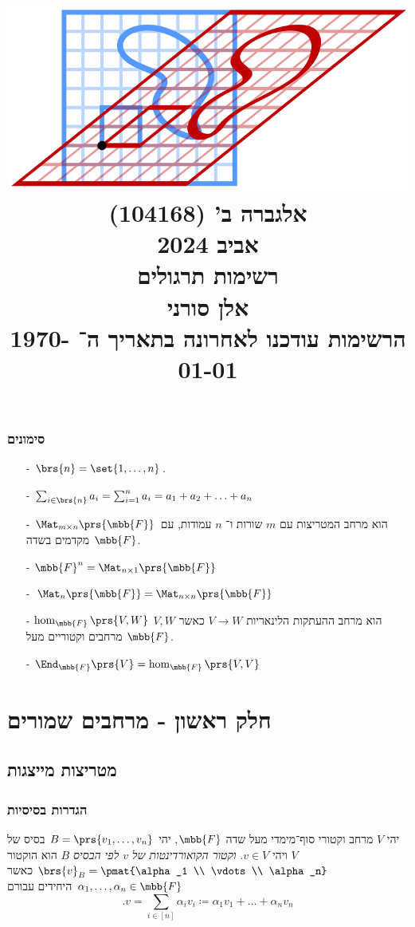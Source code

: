 \documentclass[a4paper,10pt,twoside,openany]{book}
\title{
\includegraphics[width=6in]{images/front.png}\\
\vspace{30pt}
\Huge
אלגברה ב' (104168)
\\
אביב 2024
\\
רשימות תרגולים
\vspace{30pt}
\\
\huge
אלן סורני
\vspace{30pt}
\\
\Large
הרשימות עודכנו לאחרונה בתאריך ה־%
\today
}
\date{}
\begin{document}
\frontmatter
\maketitle
\tableofcontents

\mainmatter

\section*{סימונים}

\begin{itemize}
\item[-]
$\brs{n} = \set{1, \ldots, n}$.
\item[-]
$\sum_{i \in \brs{n}} a_i = \sum_{i=1}^n a_i = a_1 + a_2 + \ldots + a_n$
\item[-] $\Mat_{m \times n}\prs{\mbb{F}}$ הוא מרחב המטריצות עם
$m$
שורות ו־%
$n$
עמודות, עם מקדמים בשדה
$\mbb{F}$.
\item[-]
$\mbb{F}^n = \Mat_{n \times 1}\prs{\mbb{F}}$
\item[-]
$\Mat_{n}\prs{\mbb{F}} = \Mat_{n \times n}\prs{\mbb{F}}$
\item[-]
$\hom_{\mbb{F}}\prs{V,W}$
הוא מרחב ההעתקות הלינאריות
$V \to W$
כאשר
$V,W$
מרחבים וקטוריים מעל
$\mbb{F}$.
\item[-]
$\End_{\mbb{F}}\prs{V} = \hom_{\mbb{F}}\prs{V,V}$
\end{itemize}

\part{חלק ראשון - מרחבים שמורים}

\chapter{מטריצות מייצגות}

\section{הגדרות בסיסיות}

\begin{definition}
יהי
$V$
מרחב וקטורי סוף־מימדי מעל שדה
$\mbb{F}$,
יהי
$B = \prs{v_1, \ldots, v_n}$
בסיס של
$V$
ויהי
$v \in V$.
\emph{וקטור הקואורדינטות של
$v$
לפי הבסיס
$B$}
הוא הוקטור
$\brs{v}_B = \pmat{\alpha_1 \\ \vdots \\ \alpha_n}$
כאשר
$\alpha_1, \ldots, \alpha_n \in \mbb{F}$
היחידים עבורם
\[\text{.}v = \sum_{i \in [n]} \alpha_i v_i \coloneqq \alpha_1 v_1 + \ldots + \alpha_n v_n\]
\end{definition}
\end{document}
